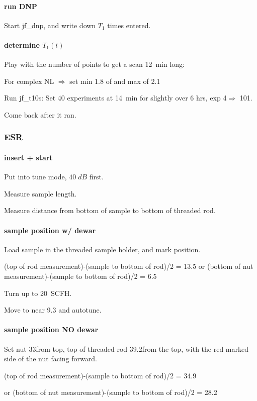 \paragraph{run DNP}
Start jf\_dnp, and write down $T_1$ times entered.

\paragraph{determine $T_1(t)$}
Play with the number of points to get a scan 12~min long:

For complex NL $\Rightarrow$ set min 1.8 of and max of 2.1

Run jf\_t10s:
Set 40 experiments at 14~min for slightly over 6 hrs, exp 4$\Rightarrow$ 101.

Come back after it ran.


\subsubsection{ESR}
\paragraph{insert + start}
Put into tune mode, $40\;dB$ first.

Measure sample length.

Measure distance from bottom of sample to bottom of threaded rod.

\paragraph{sample position w/ dewar}
Load sample in the threaded sample holder, and mark position.

(top of rod measurement)-(sample to bottom of rod)/2 = 13.5
or (bottom of nut measurement)-(sample to bottom of rod)/2 = 6.5

Turn up to 20~SCFH.

Move to near 9.3 and autotune.

\paragraph{sample position NO dewar}
Set nut 33\mm from top, top of threaded rod 39.2\mm from the top, with the red marked side of the nut facing forward.

(top of rod measurement)-(sample to bottom of rod)/2 = 34.9

or (bottom of nut measurement)-(sample to bottom of rod)/2 = 28.2

